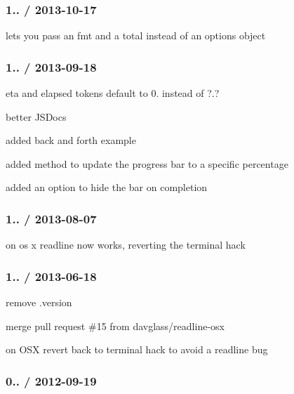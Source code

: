 \subsubsection*{1.. / 2013-\/10-\/17}


\begin{DoxyItemize}
\item lets you pass an {\ttfamily fmt} and a {\ttfamily total} instead of an options object
\end{DoxyItemize}

\subsubsection*{1.. / 2013-\/09-\/18}


\begin{DoxyItemize}
\item eta and elapsed tokens default to 0. instead of ?.?
\item better J\+S\+Docs
\item added back and forth example
\item added method to update the progress bar to a specific percentage
\item added an option to hide the bar on completion
\end{DoxyItemize}

\subsubsection*{1.. / 2013-\/08-\/07}


\begin{DoxyItemize}
\item on os x readline now works, reverting the terminal hack
\end{DoxyItemize}

\subsubsection*{1.. / 2013-\/06-\/18}


\begin{DoxyItemize}
\item remove .version
\item merge pull request \#15 from davglass/readline-\/osx
\item on O\+SX revert back to terminal hack to avoid a readline bug
\end{DoxyItemize}

\subsubsection*{0.. / 2012-\/09-\/19}


